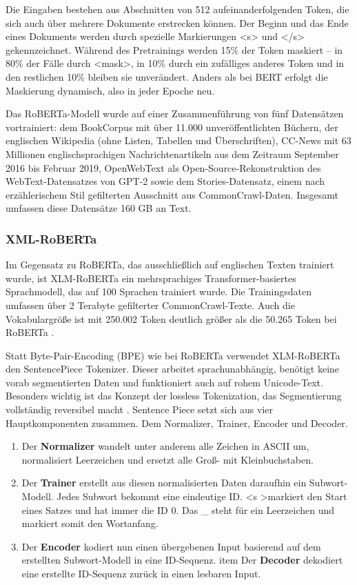 Die Eingaben bestehen aus Abschnitten von 512 aufeinanderfolgenden Token, die sich auch über mehrere Dokumente erstrecken können. 
Der Beginn und das Ende eines Dokuments werden durch spezielle Markierungen <s> und </s> gekennzeichnet. 
Während des Pretrainings werden 15\% der Token maskiert – in 80\% der Fälle durch <mask>, in 10\% durch 
ein zufälliges anderes Token und in den restlichen 10\% bleiben sie unverändert. 
Anders als bei BERT erfolgt die Maskierung dynamisch, also in jeder Epoche neu.

Das RoBERTa-Modell wurde auf einer Zusammenführung von fünf Datensätzen vortrainiert: dem BookCorpus mit über 11.000 
unveröffentlichten Büchern, der englischen Wikipedia (ohne Listen, Tabellen und Überschriften), 
CC-News mit 63 Millionen englischsprachigen Nachrichtenartikeln aus dem Zeitraum September 2016 bis Februar 2019, 
OpenWebText als Open-Source-Rekonstruktion des WebText-Datensatzes von GPT-2 sowie dem Stories-Datensatz, 
einem nach erzählerischem Stil gefilterten Ausschnitt aus CommonCrawl-Daten. Insgesamt umfassen diese Datensätze 160 GB an Text. %

\subsubsection{XML-RoBERTa} \label{sec04:xml_roberta}

Im Gegensatz zu RoBERTa, das ausschließlich auf englischen Texten trainiert wurde, ist XLM-RoBERTa ein mehrsprachiges 
Transformer-basiertes Sprachmodell, das auf 100 Sprachen trainiert wurde. 
Die Trainingsdaten umfassen über 2 Terabyte gefilterter CommonCrawl-Texte.
Auch die Vokabulargröße ist mit 250.002 Token deutlich größer als die 50.265 Token bei RoBERTa \cite{DBLP:journals/corr/abs-1911-02116}.

Statt Byte-Pair-Encoding (BPE) wie bei RoBERTa verwendet XLM-RoBERTa den SentencePiece Tokenizer.
Dieser arbeitet sprachunabhängig, benötigt keine vorab segmentierten Daten und funktioniert auch auf rohem Unicode-Text. 
Besonders wichtig ist das Konzept der lossless Tokenization, das Segmentierung vollständig reversibel macht \cite{kudo-richardson-2018-sentencepiece}.
Sentence Piece setzt sich aus vier Hauptkomponenten zusammen. Dem Normalizer, Trainer, Encoder und Decoder. 

\begin{enumerate}
    \item Der \textbf{Normalizer} wandelt unter anderem alle Zeichen in ASCII um, normalisiert Leerzeichen und ersetzt alle Groß- mit Kleinbuchstaben.
    \item Der \textbf{Trainer} erstellt aus diesen normalisierten Daten daraufhin ein Subwort-Modell. Jedes Subwort bekommt eine eindeutige ID.
    \textless s \textgreater markiert den Start eines Satzes und hat immer die ID 0. Das \_ steht für ein Leerzeichen und markiert somit den Wortanfang.
    \item Der \textbf{Encoder} kodiert nun einen übergebenen Input basierend auf dem erstellten Subwort-Modell in eine ID-Sequenz.
    item Der \textbf{Decoder} dekodiert eine erstellte ID-Sequenz zurück in einen lesbaren Input.
\end{enumerate}

